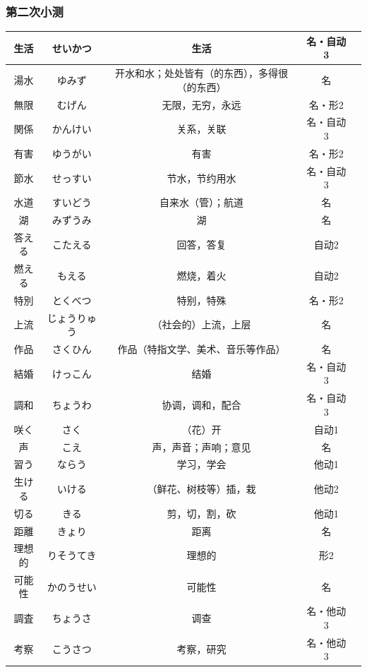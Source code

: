 \subsubsection{第二次小测}
\begin{longtable}{|c|c|c|c|c|}
    \hline
    生活 & せいかつ & 生活 & 名・自动3 & \\ \hline
    湯水 & ゆみず & 开水和水；处处皆有（的东西），多得很（的东西） & 名 & \\ \hline
    無限 & むげん & 无限，无穷，永远 & 名・形2 & \\ \hline
    関係 & かんけい & 关系，关联 & 名・自动3 & \\ \hline
    有害 & ゆうがい & 有害 & 名・形2 & \\ \hline
    節水 & せっすい & 节水，节约用水 & 名・自动3 & \\ \hline
    水道 & すいどう & 自来水（管）；航道 & 名 & \\ \hline
    湖 & みずうみ & 湖 & 名 & \\ \hline
    答える & こたえる & 回答，答复 & 自动2 & \\ \hline
    燃える & もえる & 燃烧，着火 & 自动2 & \\ \hline
    特別 & とくべつ & 特别，特殊 & 名・形2 & \\ \hline
    上流 & じょうりゅう & （社会的）上流，上层 & 名 & \\ \hline
    作品 & さくひん & 作品（特指文学、美术、音乐等作品） & 名 & \\ \hline
    結婚 & けっこん & 结婚 & 名・自动3 & \\ \hline
    調和 & ちょうわ & 协调，调和，配合 & 名・自动3 & \\ \hline
    咲く & さく & （花）开 & 自动1 & \\ \hline
    声 & こえ & 声，声音；声响；意见 & 名 & \\ \hline
    習う & ならう & 学习，学会 & 他动1 & \\ \hline
    生ける & いける & （鲜花、树枝等）插，栽 & 他动2 & \\ \hline
    切る & きる & 剪，切，割，砍 & 他动1 & \\ \hline
    距離 & きょり & 距离 & 名 & \\ \hline
    理想的 & りそうてき & 理想的 & 形2 & \\ \hline
    可能性 & かのうせい & 可能性 & 名 & \\ \hline
    調査 & ちょうさ & 调查 & 名・他动3 & \\ \hline
    考察 & こうさつ & 考察，研究 & 名・他动3 & \\ \hline

\end{longtable}
